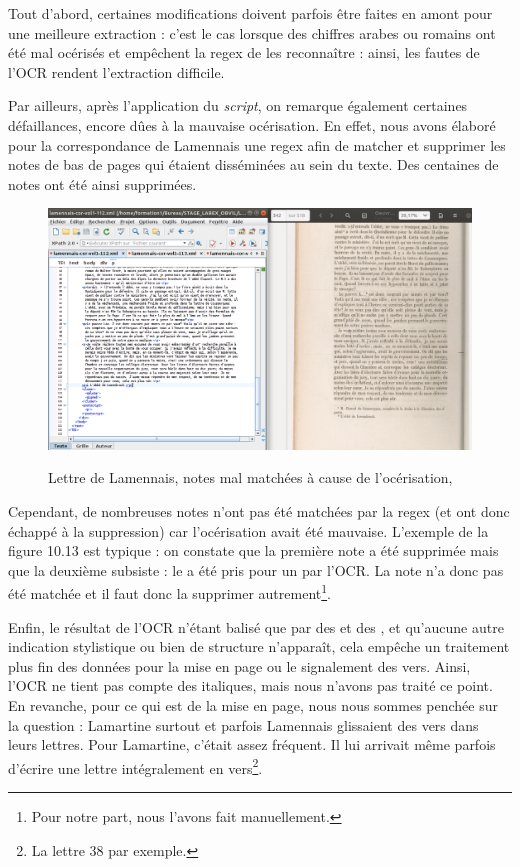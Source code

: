 Tout d'abord, certaines modifications doivent parfois être faites en amont pour une meilleure extraction : c'est le cas lorsque des chiffres arabes ou romains ont été mal océrisés et empêchent la regex de les reconnaître : ainsi, les fautes de l'OCR rendent l'extraction difficile.

Par ailleurs, après l'application du \emph{script}, on remarque également certaines défaillances, encore dûes à la mauvaise océrisation. En effet, nous avons élaboré pour la correspondance de Lamennais une regex afin de matcher et supprimer les notes de bas de pages qui étaient disséminées au sein du texte. Des centaines de notes ont été ainsi supprimées. 
\begin{figure}[ht]
    \centering
    \caption{Lettre de Lamennais, notes mal matchées à cause de l'océrisation, }
    \includegraphics[width=16cm]{images/notesLamennais.png}
    \label{notesLamennais}
\end{figure}
Cependant, de nombreuses notes n'ont pas été matchées par la regex (et ont donc échappé à la suppression) car l'océrisation avait été mauvaise. L'exemple de la figure 10.13 est typique : on constate que la première note a été supprimée mais que la deuxième subsiste : le  a été pris pour un  par l'OCR. La note n'a donc pas été matchée et il faut donc la supprimer autrement\footnote{Pour notre part, nous l'avons fait manuellement.}.

Enfin, le résultat de l'OCR n'étant balisé que par des  et des , et qu'aucune autre indication stylistique ou bien de structure n'apparaît, cela empêche un traitement plus fin des données pour la mise en page ou le signalement des vers. Ainsi, l'OCR ne tient pas compte des italiques, mais nous n'avons pas traité ce point. En revanche, pour ce qui est de la mise en page, nous nous sommes penchée sur la question : Lamartine surtout et parfois Lamennais glissaient des vers dans leurs lettres. Pour Lamartine, c'était assez fréquent. Il lui arrivait même parfois d'écrire une lettre intégralement en vers\footnote{La lettre 38 par exemple.}.

